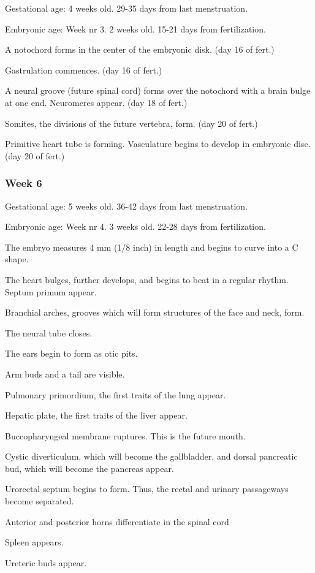 \documentclass[12pt,a4paper,onecolumn]{article}
\begin{document}
Gestational age: 4 weeks old. 29-35 days from last menstruation.

Embryonic age: Week nr 3. 2 weeks old. 15-21 days from fertilization.

\begin{wuxch_item}
    \item A notochord forms in the center of the embryonic disk. (day 16 of fert.)
    \item Gastrulation commences. (day 16 of fert.)
    \item A neural groove (future spinal cord) forms over the notochord with a brain bulge at one end. Neuromeres appear. (day 18 of fert.)
    \item Somites, the divisions of the future vertebra, form. (day 20 of fert.)
    \item Primitive heart tube is forming. Vasculature begins to develop in embryonic disc. (day 20 of fert.)
\end{wuxch_item}

\subsubsection{Week 6}

Gestational age: 5 weeks old. 36-42 days from last menstruation.

Embryonic age: Week nr 4. 3 weeks old. 22-28 days from fertilization.

\begin{wuxch_item}
    \item The embryo measures 4 mm (1/8 inch) in length and begins to curve into a C shape.
    \item The heart bulges, further develops, and begins to beat in a regular rhythm. Septum primum appear.
    \item Branchial arches, grooves which will form structures of the face and neck, form.
    \item The neural tube closes.
    \item The ears begin to form as otic pits.
    \item Arm buds and a tail are visible.
    \item Pulmonary primordium, the first traits of the lung appear.
    \item Hepatic plate, the first traits of the liver appear.
    \item Buccopharyngeal membrane ruptures. This is the future mouth.
    \item Cystic diverticulum, which will become the gallbladder, and dorsal pancreatic bud, which
      will become the pancreas appear.
    \item Urorectal septum begins to form. Thus, the rectal and urinary passageways become separated.
    \item Anterior and posterior horns differentiate in the spinal cord
    \item Spleen appears.
    \item Ureteric buds appear.
\end{wuxch_item}
\end{document}
